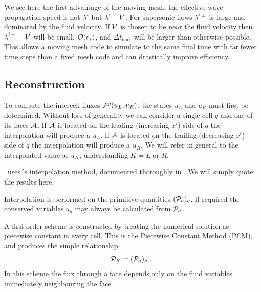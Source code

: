   We see here the first advantage of the moving mesh, the effective wave propagation speed is not $\lambda^i$ but $\lambda^i - V^i$.  For supersonic flows $\lambda^{i\pm}$ is large and dominated by the fluid velocity.  If $V^i$ is chosen to be near the fluid velocity then $\lambda^{i\pm} - V^i$ will be small, $\OO (c_s)$, and $\Delta t_{\mathrm{max}}$ will be larger than otherwise possible.  This allows a moving mesh code to simulate to the same final time with far fewer time steps than a fixed mesh code and can drastically improve efficiency.

\subsection{Reconstruction}

To compute the intercell fluxes $\FF^p(u_L,u_R)$, the states $u_L$ and $u_R$ must first be determined.  Without loss of generality we can consider a single cell $q$ and one of its faces $\AA$.  If $\AA$ is located on the leading (increasing $x^i$) side of $q$ the interpolation will produce a $u_L$.  If $\AA$ is located on the trailing (decreasing $x^i$) side of $q$ the interpolation will produce a $u_R$.  We will refer in general to the interpolated value as $u_K$, understanding $K=L$ or $R$.

\grdisco\ uses \disco's interpolation method, documented thoroughly in \citep{Duffell16}.  We will simply quote the results here.

Interpolation is performed on the primitive quantities $(\PP_a)_q$.  If required the conserved variables $u_a$ may always be calculated from $\PP_a$.

A first order scheme is constructed by treating the numerical solution as piecewise constant in every cell.  This is the Piecewise Constant Method (PCM), and produces the simple relationship:
\begin{equation}
	\PP_K = (\PP_a)_q\ .
\end{equation}
In this scheme the flux through a face depends only on the fluid variables immediately neighbouring the face.


